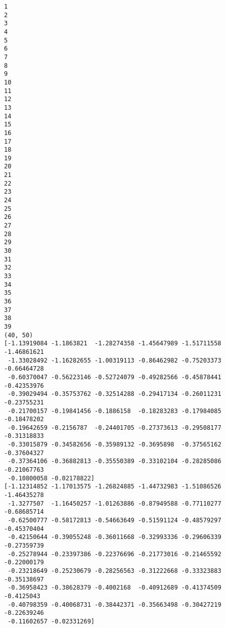 \documentclass[11pt]{article}
\begin{document}
    \begin{Verbatim}[commandchars=\\\{\}]
1
2
3
4
5
6
7
8
9
10
11
12
13
14
15
16
17
18
19
20
21
22
23
24
25
26
27
28
29
30
31
32
33
34
35
36
37
38
39
(40, 50)
[-1.13919084 -1.1863821  -1.28274358 -1.45647989 -1.51711558 -1.46861621
 -1.33028492 -1.16282655 -1.00319113 -0.86462982 -0.75203373 -0.66464728
 -0.60370047 -0.56223146 -0.52724079 -0.49282566 -0.45878441 -0.42353976
 -0.39029494 -0.35753762 -0.32514288 -0.29417134 -0.26011231 -0.23755231
 -0.21700157 -0.19841456 -0.1886158  -0.18283283 -0.17984085 -0.18478202
 -0.19642659 -0.2156787  -0.24401705 -0.27373613 -0.29508177 -0.31318833
 -0.33015879 -0.34582656 -0.35989132 -0.3695898  -0.37565162 -0.37604327
 -0.37364106 -0.36882813 -0.35550389 -0.33102104 -0.28285086 -0.21067763
 -0.10800058 -0.02178822]
[-1.12314852 -1.17013575 -1.26824885 -1.44732983 -1.51086526 -1.46435278
 -1.3277507  -1.16450257 -1.01263886 -0.87949588 -0.77110277 -0.68685714
 -0.62500777 -0.58172813 -0.54663649 -0.51591124 -0.48579297 -0.45370404
 -0.42150644 -0.39055248 -0.36011668 -0.32993336 -0.29606339 -0.27359739
 -0.25278944 -0.23397386 -0.22376696 -0.21773016 -0.21465592 -0.22000179
 -0.23218649 -0.25230679 -0.28256563 -0.31222668 -0.33323883 -0.35138697
 -0.36958423 -0.38628379 -0.4002168  -0.40912689 -0.41374509 -0.4125043
 -0.40798359 -0.40068731 -0.38442371 -0.35663498 -0.30427219 -0.22639246
 -0.11602657 -0.02331269]

    \end{Verbatim}
\end{document}
